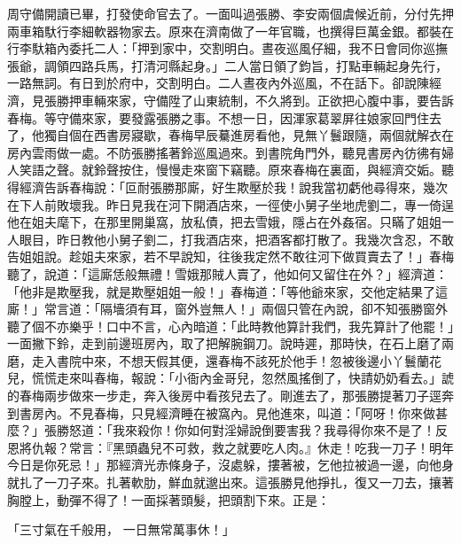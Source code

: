\begin{showcontents}{}
周守備開讀已畢，打發使命官去了。一面叫過張勝、李安兩個虞候近前，分付先押兩車箱馱行李細軟器物家去。原來在濟南做了一年官職，也撰得巨萬金銀。都裝在行李馱箱內委托二人：「押到家中，交割明白。晝夜巡風仔細，我不日會同你巡撫張爺，調領四路兵馬，打清河縣起身。」二人當日領了鈞旨，打點車輛起身先行，一路無詞。有日到於府中，交割明白。二人晝夜內外巡風，不在話下。卻說陳經濟，見張勝押車輛來家，守備陞了山東統制，不久將到。正欲把心腹中事，要告訴春梅。等守備來家，要發露張勝之事。不想一日，因渾家葛翠屏往娘家回門住去了，他獨自個在西書房寢歇，春梅早辰驀進房看他，見無丫鬟跟隨，兩個就解衣在房內雲雨做一處。不防張勝搖著鈴巡風過來。到書院角門外，聽見書房內彷彿有婦人笑語之聲。就鈴聲按住，慢慢走來窗下竊聽。原來春梅在裏面，與經濟交姤。聽得經濟告訴春梅說：「叵耐張勝那廝，好生欺壓於我！說我當初虧他尋得來，幾次在下人前敗壞我。昨日見我在河下開酒店來，一徑使小舅子坐地虎劉二，專一倚逞他在姐夫麾下，在那里開巢窩，放私債，把去雪娥，隱占在外姦宿。只瞞了姐姐一人眼目，昨日教他小舅子劉二，打我酒店來，把酒客都打散了。我幾次含忍，不敢告姐姐說。趁姐夫來家，若不早說知，往後我定然不敢往河下做買賣去了！」春梅聽了，說道：「這廝恁般無禮！雪娥那賊人賣了，他如何又留住在外？」經濟道：「他非是欺壓我，就是欺壓姐姐一般！」春梅道：「等他爺來家，交他定結果了這廝！」常言道：「隔墻須有耳，窗外豈無人！」兩個只管在內說，卻不知張勝窗外聽了個不亦樂乎！口中不言，心內暗道：「此時教他算計我們，我先算計了他罷！」一面撇下鈴，走到前邊班房內，取了把解腕鋼刀。說時遲，那時快，在石上磨了兩磨，走入書院中來，不想天假其便，還春梅不該死於他手！忽被後邊小丫鬟蘭花兒，慌慌走來叫春梅，報說：「小衙內金哥兒，忽然風搖倒了，快請奶奶看去。」諕的春梅兩步做來一步走，奔入後房中看孩兒去了。剛進去了，那張勝提著刀子逕奔到書房內。不見春梅，只見經濟睡在被窩內。見他進來，叫道：「阿呀！你來做甚麼？」張勝怒道：「我來殺你！你如何對淫婦說倒要害我？我尋得你來不是了！反恩將仇報？常言：『黑頭蟲兒不可救，救之就要吃人肉。』休走！吃我一刀子！明年今日是你死忌！」那經濟光赤條身子，沒處躲，摟著被，乞他拉被過一邊，向他身就扎了一刀子來。扎著軟肋，鮮血就邈出來。這張勝見他掙扎，復又一刀去，攘著胸膛上，動彈不得了！一面採著頭髮，把頭割下來。正是：

「三寸氣在千般用，  一日無常萬事休！」


\end{showcontents}
